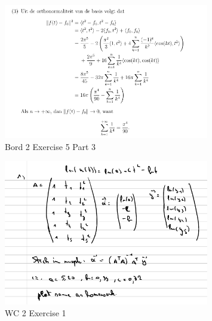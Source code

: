 \documentclass[a4paper]{article}
\begin{document}
\begin{figure}[H]
	\centering
	\includegraphics[width=0.8\textwidth]{assets/bord_2_ex_5_part_3.png}
	\caption{Bord 2 Exercise 5 Part 3}
	\label{fig:bord_2_ex_5_part_3}
\end{figure}

\begin{figure}[H]
	\centering
	\includegraphics[width=0.8\textwidth]{images/wc_2_ex_1.png}
	\caption{WC 2 Exercise 1}
	\label{fig:wc_2_ex_1}
\end{figure}
\end{document}
